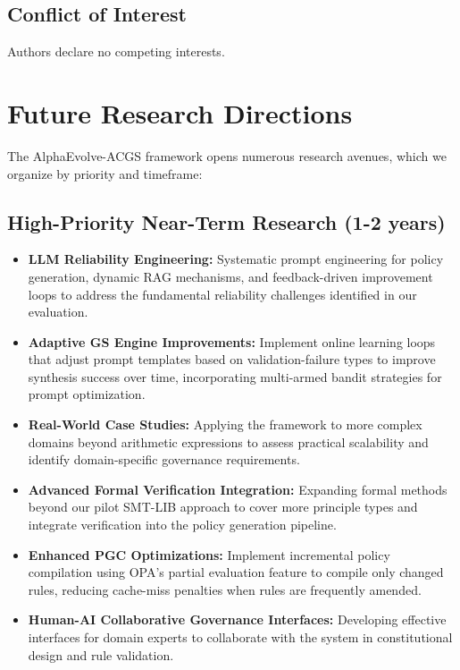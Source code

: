 \documentclass[sigconf,natbib]{acmart}
\begin{document}
\subsection{Conflict of Interest}
Authors declare no competing interests.

\section{Future Research Directions}
\label{sec:future_work}
The AlphaEvolve-ACGS framework opens numerous research avenues, which we organize by priority and timeframe:

\subsection{High-Priority Near-Term Research (1-2 years)}
\label{subsec:near_term_research}
\begin{itemize}
    \item \textbf{LLM Reliability Engineering:} Systematic prompt engineering for policy generation, dynamic RAG mechanisms, and feedback-driven improvement loops to address the fundamental reliability challenges identified in our evaluation.
    \item \textbf{Adaptive GS Engine Improvements:} Implement online learning loops that adjust prompt templates based on validation-failure types to improve synthesis success over time, incorporating multi-armed bandit strategies for prompt optimization.
    \item \textbf{Real-World Case Studies:} Applying the framework to more complex domains beyond arithmetic expressions to assess practical scalability and identify domain-specific governance requirements.
    \item \textbf{Advanced Formal Verification Integration:} Expanding formal methods beyond our pilot SMT-LIB approach to cover more principle types and integrate verification into the policy generation pipeline.
    \item \textbf{Enhanced PGC Optimizations:} Implement incremental policy compilation using OPA's partial evaluation feature to compile only changed rules, reducing cache-miss penalties when rules are frequently amended.
    \item \textbf{Human-AI Collaborative Governance Interfaces:} Developing effective interfaces for domain experts to collaborate with the system in constitutional design and rule validation.
\end{itemize}
\end{document}
